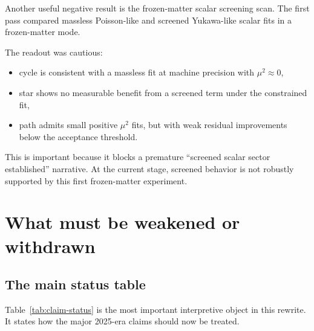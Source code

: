 \documentclass[11pt]{article}
\begin{document}
Another useful negative result is the frozen-matter scalar screening scan. The first pass compared massless Poisson-like and screened Yukawa-like scalar fits in a frozen-matter mode.

The readout was cautious:
\begin{itemize}
    \item cycle is consistent with a massless fit at machine precision with $\mu^2 \approx 0$,
    \item star shows no measurable benefit from a screened term under the constrained fit,
    \item path admits small positive $\mu^2$ fits, but with weak residual improvements below the acceptance threshold.
\end{itemize}

This is important because it blocks a premature ``screened scalar sector established'' narrative. At the current stage, screened behavior is not robustly supported by this first frozen-matter experiment.

\section{What must be weakened or withdrawn}

\subsection{The main status table}

Table~\ref{tab:claim-status} is the most important interpretive object in this rewrite. It states how the major 2025-era claims should now be treated.
\end{document}
